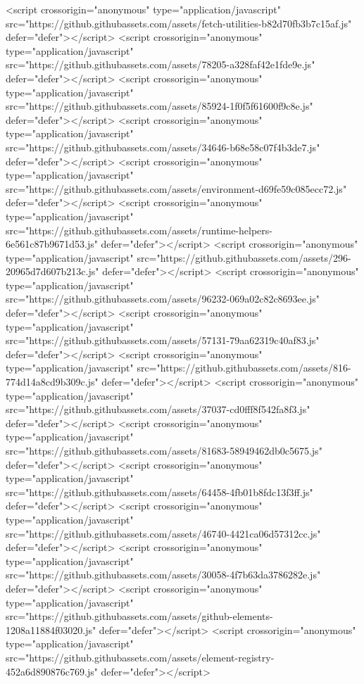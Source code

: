 <script crossorigin="anonymous" type="application/javascript" src="https://github.githubassets.com/assets/fetch-utilities-b82d70fb3b7c15af.js" defer="defer"></script>
<script crossorigin="anonymous" type="application/javascript" src="https://github.githubassets.com/assets/78205-a328faf42e1fde9e.js" defer="defer"></script>
<script crossorigin="anonymous" type="application/javascript" src="https://github.githubassets.com/assets/85924-1f0f5f61600f9c8e.js" defer="defer"></script>
<script crossorigin="anonymous" type="application/javascript" src="https://github.githubassets.com/assets/34646-b68e58c07f4b3de7.js" defer="defer"></script>
<script crossorigin="anonymous" type="application/javascript" src="https://github.githubassets.com/assets/environment-d69fe59c085ecc72.js" defer="defer"></script>
<script crossorigin="anonymous" type="application/javascript" src="https://github.githubassets.com/assets/runtime-helpers-6e561c87b9671d53.js" defer="defer"></script>
<script crossorigin="anonymous" type="application/javascript" src="https://github.githubassets.com/assets/296-20965d7d607b213c.js" defer="defer"></script>
<script crossorigin="anonymous" type="application/javascript" src="https://github.githubassets.com/assets/96232-069a02c82c8693ee.js" defer="defer"></script>
<script crossorigin="anonymous" type="application/javascript" src="https://github.githubassets.com/assets/57131-79aa62319c40af83.js" defer="defer"></script>
<script crossorigin="anonymous" type="application/javascript" src="https://github.githubassets.com/assets/816-774d14a8cd9b309c.js" defer="defer"></script>
<script crossorigin="anonymous" type="application/javascript" src="https://github.githubassets.com/assets/37037-cd0fff8f542fa8f3.js" defer="defer"></script>
<script crossorigin="anonymous" type="application/javascript" src="https://github.githubassets.com/assets/81683-58949462db0c5675.js" defer="defer"></script>
<script crossorigin="anonymous" type="application/javascript" src="https://github.githubassets.com/assets/64458-4fb01b8fdc13f3ff.js" defer="defer"></script>
<script crossorigin="anonymous" type="application/javascript" src="https://github.githubassets.com/assets/46740-4421ca06d57312cc.js" defer="defer"></script>
<script crossorigin="anonymous" type="application/javascript" src="https://github.githubassets.com/assets/30058-4f7b63da3786282e.js" defer="defer"></script>
<script crossorigin="anonymous" type="application/javascript" src="https://github.githubassets.com/assets/github-elements-1208a11884f03020.js" defer="defer"></script>
<script crossorigin="anonymous" type="application/javascript" src="https://github.githubassets.com/assets/element-registry-452a6d890876c769.js" defer="defer"></script>
